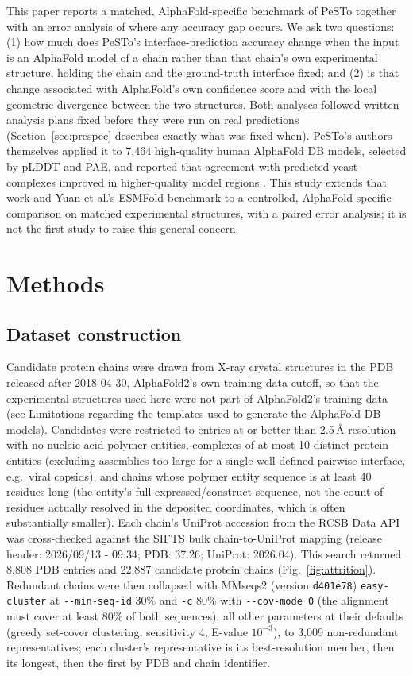 \documentclass[10pt]{article}
\begin{document}
This paper reports a matched, AlphaFold-specific benchmark of PeSTo together
with an error analysis of where any accuracy gap occurs. We ask two
questions: (1) how much does PeSTo's interface-prediction accuracy change when
the input is an AlphaFold model of a chain rather than that chain's own
experimental structure, holding the chain and the ground-truth interface
fixed; and (2) is that change associated with AlphaFold's own confidence score
and with the local geometric divergence between the two structures. Both
analyses followed written analysis plans fixed before they were run on real
predictions (Section~\ref{sec:prespec} describes exactly what was fixed when).
PeSTo's authors themselves applied it to 7,464 high-quality human AlphaFold
DB models, selected by pLDDT and PAE, and reported that agreement with
predicted yeast complexes improved in higher-quality model regions
\cite{krapp2023}. This study extends that work and Yuan et al.'s ESMFold
benchmark to a controlled, AlphaFold-specific comparison on matched
experimental structures, with a paired error analysis; it is not the first
study to raise this general concern.

\section{Methods}

\subsection{Dataset construction}

Candidate protein chains were drawn from X-ray crystal structures in the PDB
released after 2018-04-30, AlphaFold2's own training-data
cutoff, so that the experimental structures used here were not part of
AlphaFold2's training data (see Limitations regarding the templates used to
generate the AlphaFold DB models). Candidates were restricted to entries at
or better than 2.5\,\r{A} resolution with no nucleic-acid
polymer entities, complexes of at most 10 distinct
protein entities (excluding assemblies too large for a single well-defined
pairwise interface, e.g.\ viral capsids), and chains whose polymer entity
sequence is at least 40 residues long (the entity's full
expressed/construct sequence, not the count of residues actually resolved in
the deposited coordinates, which is often substantially smaller). Each
chain's UniProt accession from the RCSB Data API was cross-checked against
the SIFTS \cite{velankar2013} bulk chain-to-UniProt mapping (release
header: 2026/09/13 - 09:34; PDB: 37.26; UniProt: 2026.04). This search returned 8,808 PDB
entries and 22,887 candidate protein chains (Fig.~\ref{fig:attrition}).
Redundant chains were then collapsed with MMseqs2 \cite{steinegger2017}
(version \texttt{d401e78}) \texttt{easy-cluster} at
\texttt{-{}-min-seq-id} 30\% and \texttt{-c}
80\% with \texttt{-{}-cov-mode 0} (the alignment must cover
at least 80\% of both sequences), all other parameters at
their defaults (greedy set-cover clustering, sensitivity 4, E-value
$10^{-3}$), to 3,009 non-redundant representatives; each cluster's
representative is its best-resolution member, then its longest, then the
first by PDB and chain identifier.
\end{document}
